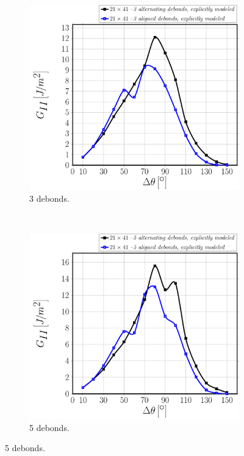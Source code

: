 \documentclass[smallextended]{svjour3}       %
\begin{document}
\begin{figure}[!h]
\centering
    \begin{subfigure}[b]{0.475\textwidth}
        \includegraphics[width=\textwidth]{comparison-explicitmodel-3debs-vf60-GII.pdf}
        \caption{3 debonds.}\label{subfig:finitedebscomparisonModeII3debs}
    \end{subfigure} ~
    \begin{subfigure}[b]{0.475\textwidth}
        \includegraphics[width=\textwidth]{comparison-explicitmodel-5debs-vf60-GII.pdf}
        \caption{5 debonds.}\label{subfig:finitedebscomparisonModeII5debs}
    \end{subfigure}
    

\end{figure}
\end{document}
